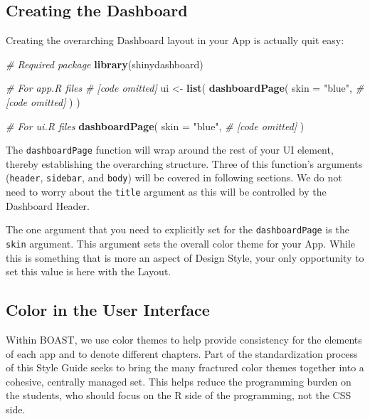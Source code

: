 \documentclass[
]{book}
\newenvironment{Shaded}{\begin{snugshade}}{\end{snugshade}}
\newcommand{\CommentTok}[1]{\textcolor[rgb]{0.56,0.35,0.01}{\textit{#1}}}
\newcommand{\DataTypeTok}[1]{\textcolor[rgb]{0.13,0.29,0.53}{#1}}
\newcommand{\KeywordTok}[1]{\textcolor[rgb]{0.13,0.29,0.53}{\textbf{#1}}}
\newcommand{\NormalTok}[1]{#1}
\newcommand{\StringTok}[1]{\textcolor[rgb]{0.31,0.60,0.02}{#1}}
\begin{document}
\hypertarget{creating-the-dashboard}{%
\subsection{Creating the Dashboard}\label{creating-the-dashboard}}

Creating the overarching Dashboard layout in your App is actually quit easy:

\begin{Shaded}
\begin{Highlighting}[]
\CommentTok{# Required package}
\KeywordTok{library}\NormalTok{(shinydashboard)}

\CommentTok{# For app.R files}
\CommentTok{# [code omitted]}
\NormalTok{ui <-}\StringTok{ }\KeywordTok{list}\NormalTok{(}
  \KeywordTok{dashboardPage}\NormalTok{(}
    \DataTypeTok{skin =} \StringTok{"blue"}\NormalTok{,}
    \CommentTok{# [code omitted]}
\NormalTok{  )}
\NormalTok{)}

\CommentTok{# For ui.R files}
\KeywordTok{dashboardPage}\NormalTok{(}
  \DataTypeTok{skin =} \StringTok{"blue"}\NormalTok{,}
  \CommentTok{# [code omitted]}
\NormalTok{)}
\end{Highlighting}
\end{Shaded}

The \texttt{dashboardPage} function will wrap around the rest of your UI element, thereby establishing the overarching structure. Three of this function's arguments (\texttt{header}, \texttt{sidebar}, and \texttt{body}) will be covered in following sections. We do not need to worry about the \texttt{title} argument as this will be controlled by the Dashboard Header.

The one argument that you need to explicitly set for the \texttt{dashboardPage} is the \texttt{skin} argument. This argument sets the overall color theme for your App. While this is something that is more an aspect of Design Style, your only opportunity to set this value is here with the Layout.

\hypertarget{colorUI}{%
\subsection{Color in the User Interface}\label{colorUI}}

Within BOAST, we use color themes to help provide consistency for the elements of each app and to denote different chapters. Part of the standardization process of this Style Guide seeks to bring the many fractured color themes together into a cohesive, centrally managed set. This helps reduce the programming burden on the students, who should focus on the R side of the programming, not the CSS side.
\end{document}
